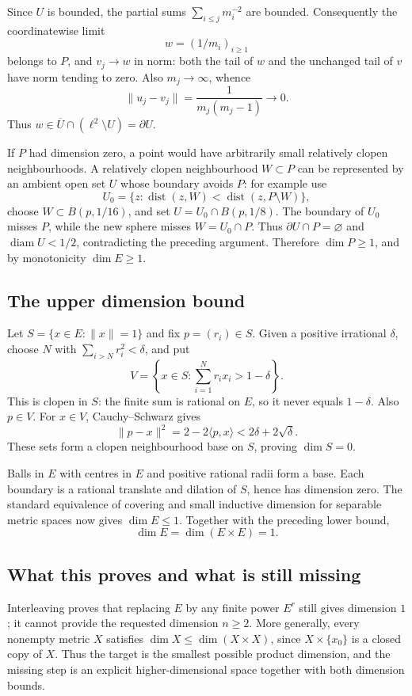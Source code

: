 Since \(U\) is bounded, the partial sums \(\sum_{i\leq j}m_i^{-2}\) are bounded. Consequently the coordinatewise limit
\[
 w=(1/m_i)_{i\geq1}
\]
belongs to \(P\), and \(v_j\to w\) in norm: both the tail of \(w\) and the unchanged tail of \(v\) have norm tending to zero.
Also \(m_j\to\infty\), whence
\[
 \|u_j-v_j\|=\frac1{m_j(m_j-1)}\longrightarrow0.
\]
Thus \(w\in\overline U\cap(\ell^2\setminus U)=\partial U\).

If \(P\) had dimension zero, a point would have arbitrarily small relatively clopen neighbourhoods.
A relatively clopen neighbourhood \(W\subset P\) can be represented by an ambient open set \(U\) whose boundary avoids \(P\): for example use
\[
 U_0=\{z:\operatorname{dist}(z,W)<\operatorname{dist}(z,P\setminus W)\},
\]
choose \(W\subset B(p,1/16)\), and set \(U=U_0\cap B(p,1/8)\). The boundary of \(U_0\) misses \(P\), while the new sphere misses \(W=U_0\cap P\). Thus \(\partial U\cap P=\varnothing\) and \(\operatorname{diam}U<1/2\), contradicting the preceding argument.
Therefore \(\dim P\geq1\), and by monotonicity \(\dim E\geq1\).

\subsection*{The upper dimension bound}
Let \(S=\{x\in E:\|x\|=1\}\) and fix \(p=(r_i)\in S\).
Given a positive irrational \(\delta\), choose \(N\) with
\(\sum_{i>N}r_i^2<\delta\), and put
\[
 V=\left\{x\in S:\sum_{i=1}^N r_ix_i>1-\delta\right\}.
\]
This is clopen in \(S\): the finite sum is rational on \(E\), so it never equals \(1-\delta\).
Also \(p\in V\). For \(x\in V\), Cauchy--Schwarz gives
\[
 \|p-x\|^2
 =2-2\langle p,x\rangle
 <2\delta+2\sqrt\delta.
\]
These sets form a clopen neighbourhood base on \(S\), proving \(\dim S=0\).

Balls in \(E\) with centres in \(E\) and positive rational radii form a base.
Each boundary is a rational translate and dilation of \(S\), hence has dimension zero.
The standard equivalence of covering and small inductive dimension for separable metric spaces now gives \(\dim E\leq1\).
Together with the preceding lower bound,
\[
 \dim E=\dim(E\times E)=1.
\]

\subsection*{What this proves and what is still missing}
Interleaving proves that replacing \(E\) by any finite power \(E^r\) still gives dimension \(1\); it cannot provide the requested dimension \(n\geq2\).
More generally, every nonempty metric \(X\) satisfies \(\dim X\leq\dim(X\times X)\), since \(X\times\{x_0\}\) is a closed copy of \(X\).
Thus the target is the smallest possible product dimension, and the missing step is an explicit higher-dimensional space together with both dimension bounds.


